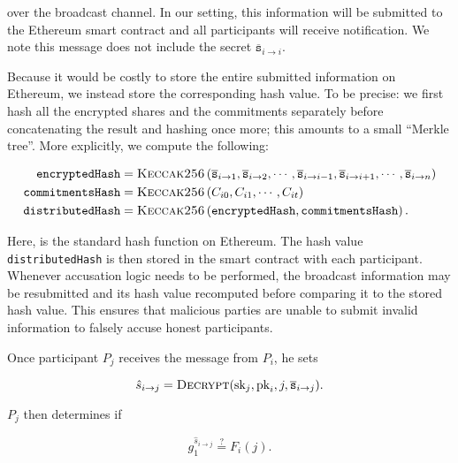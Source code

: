 \noindent
over the broadcast channel.
In our setting, this information will be submitted to the
Ethereum smart contract and
all participants will receive notification.
We note this message does not include the secret
$\overline{\texttt{s}}_{i\to i}$.

Because it would be costly to store the entire submitted information
on Ethereum, we instead store the corresponding hash value.
To be precise: we first hash all the encrypted shares
and the commitments separately before concatenating the result
and hashing once more; this amounts to a small ``Merkle tree''.
More explicitly, we compute the following:

\begin{align}
    \texttt{encryptedHash} &= \textsc{Keccak256}{}\left( 
        \overline{\texttt{s}}_{i\to 1}, \overline{\texttt{s}}_{i\to 2},
            \cdots,
            \overline{\texttt{s}}_{i\to i-1},
            \overline{\texttt{s}}_{i\to i+1},
            \cdots,
            \overline{\texttt{s}}_{i\to n} \right) \nonumber\\
        \texttt{commitmentsHash} &= \textsc{Keccak256}{}\left( C_{i0}, C_{i1}, \cdots,
            C_{it} \right)
        \nonumber\\
    \texttt{distributedHash} &= \textsc{Keccak256}{}\left( \texttt{encryptedHash},
                                    \texttt{commitmentsHash} \right).
\end{align}

\noindent
Here, \Keccak{} is the standard hash function on Ethereum.
The hash value \texttt{distributed\-Hash} is then stored in the
smart contract with each participant.
Whenever accusation logic needs to be performed,
the broadcast information may be resubmitted and its hash value
recomputed before comparing it to the stored hash value.
This ensures that malicious parties are unable to submit invalid
information to falsely accuse honest participants.

Once participant $P_{j}$ receives the message from $P_{i}$,
he sets

\begin{equation}
    \hat{s}_{i\to j} = \textsc{Decrypt}(\text{sk}_{j},\text{pk}_{i}, j,
        \overline{\texttt{s}}_{i\to j}).
\end{equation}

\noindent
$P_{j}$ then determines if

\begin{equation}
    g_{1}^{\hat{s}_{i\to j}} \overset{?}{=} F_{i}(j).
    \label{eq:secret_share_test}
\end{equation}

